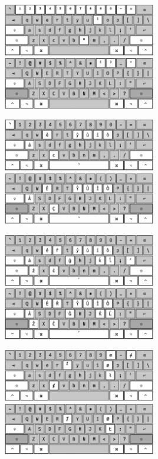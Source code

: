 \documentclass[letter,10pt]{article}
\begin{document}
\includegraphics[width=0.5\textwidth]{pics/superscript-lc.png}%
\includegraphics[width=0.5\textwidth]{pics/superscript-shift.png}
\vspace{2mm}

\includegraphics[width=0.5\textwidth]{pics/grave-lc.png}%
\includegraphics[width=0.5\textwidth]{pics/grave-shift.png}
\vspace{2mm}

\includegraphics[width=0.5\textwidth]{pics/acute-lc.png}%
\includegraphics[width=0.5\textwidth]{pics/acute-shift.png}
\vspace{2mm}

\includegraphics[width=0.5\textwidth]{pics/slash-lc.png}%
\includegraphics[width=0.5\textwidth]{pics/slash-shift.png}
\newpage
\end{document}
